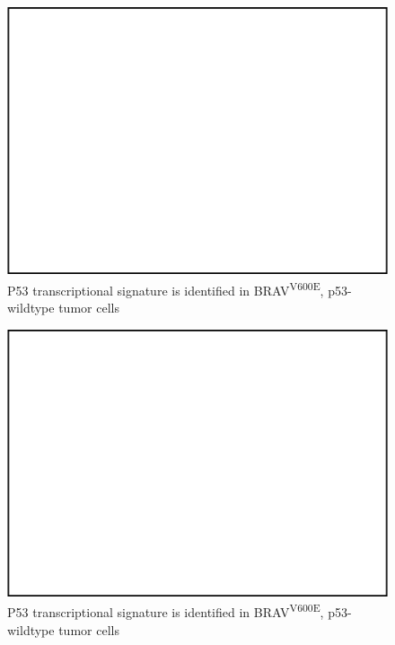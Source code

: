 \begin{figure}
\hypertarget{fig:04}{%
\centering
\includegraphics[width=1\textwidth,height=\textheight]{images/scrna_5.png}
\caption{P53 transcriptional signature is identified in BRAV\textsuperscript{V600E}, p53-wildtype tumor cells}\label{fig:04}
}
\end{figure}

\begin{figure}
\hypertarget{fig:04}{%
\centering
\includegraphics[width=1\textwidth,height=\textheight]{images/scrna_5.png}
\caption{P53 transcriptional signature is identified in BRAV\textsuperscript{V600E}, p53-wildtype tumor cells}\label{fig:04}
}
\end{figure}

